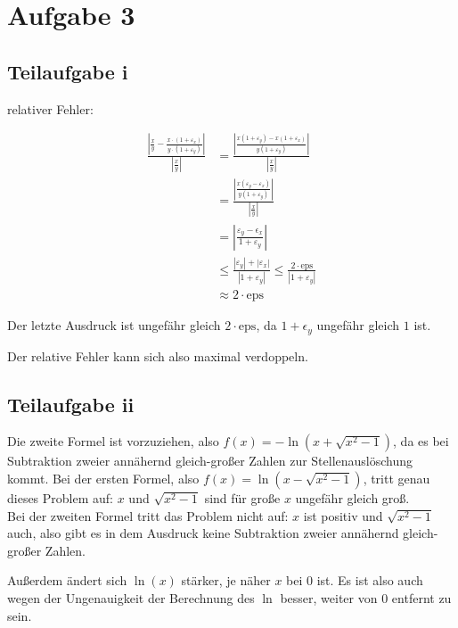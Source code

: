 \section*{Aufgabe 3}
\subsection*{Teilaufgabe i}
relativer Fehler:

\begin{align}
	\frac{ | \frac{x}{y} - \frac{x \cdot (1 + \varepsilon_x)}{y \cdot (1 + \varepsilon_y)}|}{|\frac{x}{y}|}
	&= \frac{| \frac{x(1+\varepsilon_y) - x (1+\varepsilon_x)}{y(1+\varepsilon_y)} |}{|\frac{x}{y}|} \\
	&= \frac{| \frac{x(\varepsilon_y-\varepsilon_x)}{y(1+\varepsilon_y)} |}{|\frac{x}{y}|} \\
    &= \left |\frac{\varepsilon_y - \epsilon_x }{1 + \varepsilon_y} \right |\\
	&\le \frac{|\varepsilon_y | + | \varepsilon_x |}{|1 + \varepsilon_y|} \le \frac{2 \cdot \text{eps}}{|1 + \varepsilon_y|} \\
    &\approx 2 \cdot \text{eps}
\end{align}

Der letzte Ausdruck ist ungefähr gleich $2 \cdot \text{eps}$, da $1 + \epsilon_y$ ungefähr gleich $1$ ist.

Der relative Fehler kann sich also maximal verdoppeln.

\subsection*{Teilaufgabe ii}
Die zweite Formel ist vorzuziehen, also $f(x) = -\ln (x + \sqrt{x^2-1})$, da es bei Subtraktion zweier annähernd gleich-großer Zahlen zur Stellenauslöschung kommt. Bei der ersten Formel, also $f(x) = \ln (x - \sqrt{x^2-1})$, tritt genau dieses Problem auf: $x$ und $\sqrt{x^2-1}$ sind für große $x$ ungefähr gleich groß. \\
Bei der zweiten Formel tritt das Problem nicht auf: $x$ ist positiv und $\sqrt{x^2 - 1}$ auch, also gibt es in dem Ausdruck keine Subtraktion zweier annähernd gleich-großer Zahlen.

Außerdem ändert sich $\ln(x)$ stärker, je näher $x$ bei 0 ist. Es ist
also auch wegen der Ungenauigkeit der Berechnung des $\ln$ besser,
weiter von $0$ entfernt zu sein.
